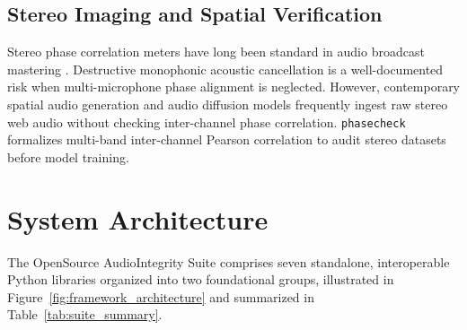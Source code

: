 \documentclass[10pt,journal,compsoc]{IEEEtran}
\begin{document}
\subsection{Stereo Imaging and Spatial Verification}
Stereo phase correlation meters have long been standard in audio broadcast mastering \cite{brixen2010audio}. Destructive monophonic acoustic cancellation is a well-documented risk when multi-microphone phase alignment is neglected. However, contemporary spatial audio generation and audio diffusion models frequently ingest raw stereo web audio without checking inter-channel phase correlation. \texttt{phasecheck} formalizes multi-band inter-channel Pearson correlation to audit stereo datasets before model training.

\section{System Architecture}
The OpenSource AudioIntegrity Suite comprises seven standalone, interoperable Python libraries organized into two foundational groups, illustrated in Figure~\ref{fig:framework_architecture} and summarized in Table~\ref{tab:suite_summary}.
\end{document}
